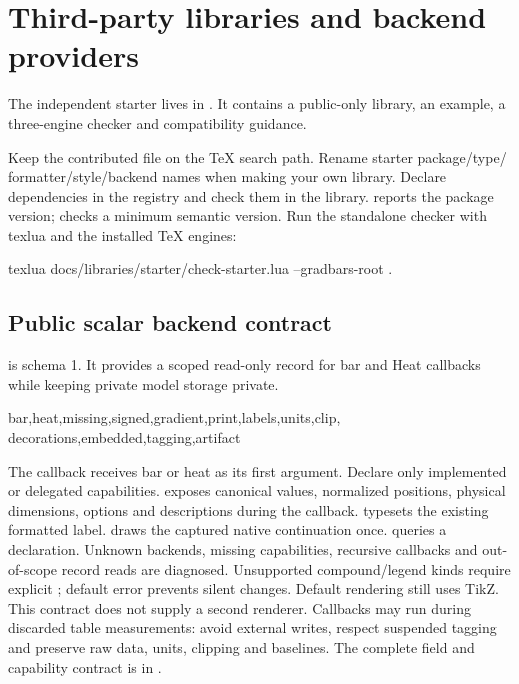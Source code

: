\section{Third-party libraries and backend providers}
The independent starter lives in . It contains a
public-only library, an example, a three-engine checker and compatibility guidance.
\begin{source}
\usepackage[libraries=none]{gradbars}
\end{source}
Keep the contributed file on the TeX search path. Rename starter package/type/
formatter/style/backend names when making your own library. Declare dependencies
in the registry and check them in the library. \key{\gradbarsversion} reports the
package version;  checks a minimum semantic version.
Run the standalone checker with texlua and the installed TeX engines:
\begin{source}
texlua docs/libraries/starter/check-starter.lua --gradbars-root .
\end{source}
\subsection{Public scalar backend contract}
\key{\gradbarsbackendversion} is schema 1. It provides a scoped read-only record
for bar and Heat callbacks while keeping private model storage private.
\begin{source}
 {bar,heat,missing,signed,gradient,print,labels,units,clip,
  decorations,embedded,tagging,artifact}
 {\gradbarsbackenddefault}
\end{source}
The callback receives bar or heat as its first argument. Declare only implemented
or delegated capabilities.  exposes canonical
values, normalized positions, physical dimensions, options and descriptions during
the callback. \key{\gradbarsbackendlabel} typesets the existing formatted label.
\key{\gradbarsbackenddefault} draws the captured native continuation once.
 queries a declaration.
Unknown backends, missing capabilities, recursive callbacks and out-of-scope
record reads are diagnosed. Unsupported compound/legend kinds require explicit
; default error prevents silent changes. Default
rendering still uses TikZ. This contract does not supply a second renderer.
Callbacks may run during discarded table measurements: avoid external writes,
respect suspended tagging and preserve raw data, units, clipping and baselines.
The complete field and capability contract is in .

